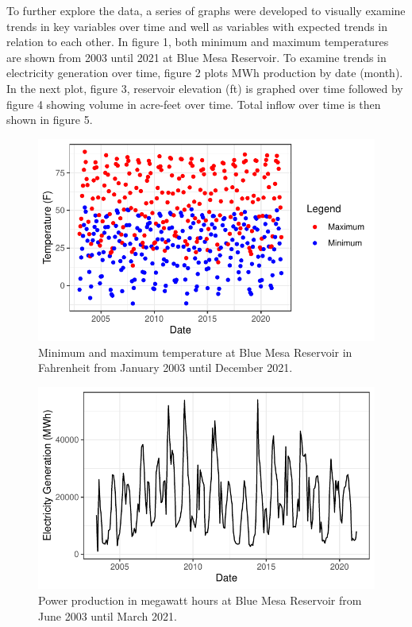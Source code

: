 \documentclass[
  12pt,
]{article}
\begin{document}
To further explore the data, a series of graphs were developed to
visually examine trends in key variables over time and well as variables
with expected trends in relation to each other. In figure 1, both
minimum and maximum temperatures are shown from 2003 until 2021 at Blue
Mesa Reservoir. To examine trends in electricity generation over time,
figure 2 plots MWh production by date (month). In the next plot, figure
3, reservoir elevation (ft) is graphed over time followed by figure 4
showing volume in acre-feet over time. Total inflow over time is then
shown in figure 5.

\begin{figure}

{\centering \includegraphics{Project_Report_files/figure-latex/min/max-1} 

}

\caption{Minimum and maximum temperature at Blue Mesa Reservoir in Fahrenheit from January 2003 until December 2021.}\label{fig:min/max}
\end{figure}

\begin{figure}

{\centering \includegraphics{Project_Report_files/figure-latex/power production-1} 

}

\caption{Power production in megawatt hours at Blue Mesa Reservoir from June 2003 until March 2021.}\label{fig:power production}
\end{figure}
\end{document}
